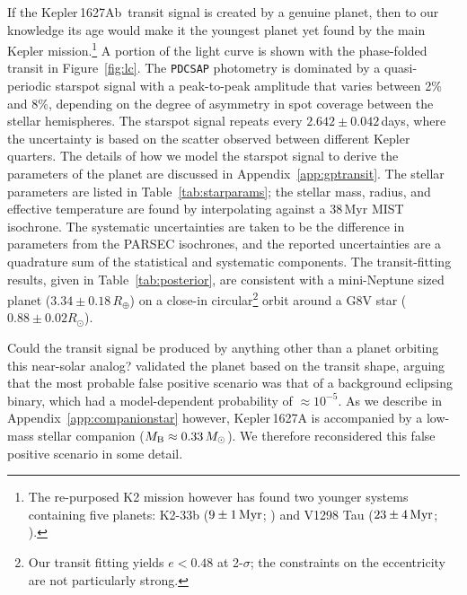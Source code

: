 \documentclass[12pt,modern,twocolumn,tighten]{aastex63}
\newcommand{\pn}{Kepler\,1627Ab} %
\begin{document}
If the \pn\ transit signal is created by a genuine planet,  then to
our knowledge its age would make it the youngest planet yet found by
the main Kepler mission.\footnote{The re-purposed K2 mission however
has found two younger systems containing five planets: K2-33b ($9\pm1\,{\rm Myr}$;
\citealt{Mann_K2_33b_2016,David_et_al_2017}) and V1298 Tau
($23\pm4\,{\rm Myr}$; \citealt{david_four_2019}).}  A portion of the
light curve is shown with the phase-folded transit in
Figure~\ref{fig:lc}.  The \texttt{PDCSAP} photometry is dominated by a
quasi-periodic starspot signal with a peak-to-peak amplitude that
varies between 2\% and 8\%, depending on the degree of asymmetry in
spot coverage between the stellar hemispheres.  The starspot signal
repeats every $2.642\pm0.042$\,days, where the uncertainty is based on
the scatter observed between different Kepler quarters.  The details
of how we model the starspot signal to derive the parameters of the
planet are discussed in Appendix~\ref{app:gptransit}.  The stellar
parameters are listed in Table~\ref{tab:starparams}; the stellar mass,
radius, and effective temperature are found by interpolating against a
38$\,$Myr MIST isochrone.  The systematic uncertainties are taken to
be the difference in parameters from the PARSEC isochrones, and the
reported uncertainties are a quadrature sum of the statistical and
systematic components.  The transit-fitting results, given in
Table~\ref{tab:posterior}, are consistent with a mini-Neptune sized
planet ($3.34\pm 0.18\,R_\oplus$) on a close-in circular\footnote{Our
transit fitting yields $e<0.48$ at 2-$\sigma$; the constraints on the
eccentricity are not particularly strong.} orbit around a G8V star
($0.88 \pm 0.02 R_\odot$).

Could the transit signal be produced by anything other than a planet
orbiting this near-solar analog?  \citet{morton_false_2016} validated
the planet based on the transit shape, arguing that the most probable 
false positive scenario was that of a background eclipsing binary,
which had a model-dependent probability of $\approx10^{-5}$.
As we describe in Appendix~\ref{app:companionstar} however,
Kepler\,1627A is accompanied by a low-mass stellar companion ($M_{\rm
B}\approx 0.33\,M_\odot$).  We therefore reconsidered this false
positive scenario in some detail. 

% 

\end{document}
